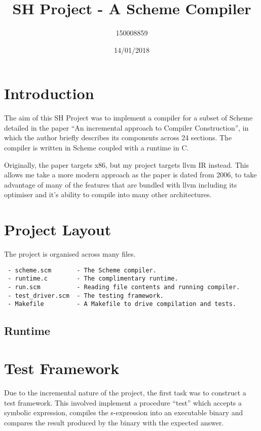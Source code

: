 \documentclass{article}
\title{SH Project - A Scheme Compiler}
\date{14/01/2018}
\author{150008859}
\begin{document}
\maketitle
\newpage

\section{Introduction}

The aim of this SH Project was to implement a compiler for a subset of Scheme detailed in the paper ``An incremental approach to Compiler Construction'', in which the author briefly describes its components across 24 sections. The compiler is written in Scheme coupled with a runtime in C.

Originally, the paper targets x86, but my project targets llvm IR instead. This allows me take a more modern approach as the paper is dated from 2006, to take advantage of many of the features that are bundled with llvm including its optimiser and it's ability to compile into many other architectures. 

\section{Project Layout}

The project is organised across many files.

\begin{verbatim}
 - scheme.scm       - The Scheme compiler.
 - runtime.c        - The complimentary runtime.
 - run.scm          - Reading file contents and running compiler.
 - test_driver.scm  - The testing framework.
 - Makefile         - A Makefile to drive compilation and tests. 
\end{verbatim}


\subsection{Runtime}


\section{Test Framework}

Due to the incremental nature of the project, the first task was to construct a test framework. This involved implement a procedure ``test'' which accepts a symbolic expression, compiles the s-expression into an executable binary and compares the result produced by the binary with the expected answer.
\end{document}
